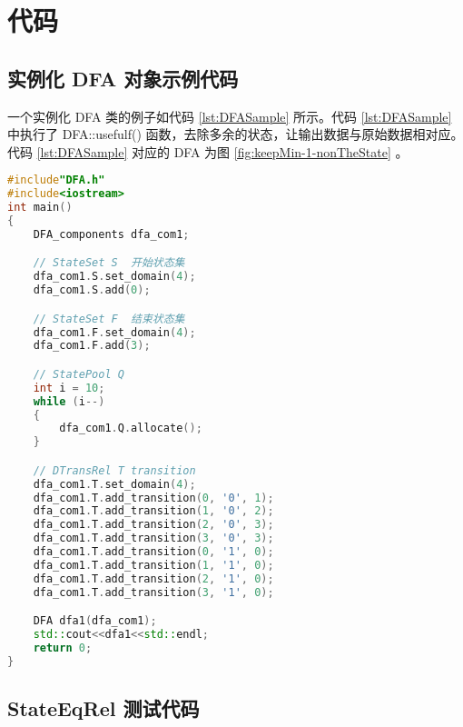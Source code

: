 \chapter{代码}

\section{实例化 DFA 对象示例代码}

一个实例化 DFA 类的例子如代码 \ref{lst:DFASample} 所示。代码 \ref{lst:DFASample} 中执行了 DFA::usefulf() 函数，去除多余的状态，让输出数据与原始数据相对应。代码 \ref{lst:DFASample} 对应的 DFA 为图 \ref{fig:keepMin-1-nonTheState} 。

\begin{lstlisting}[language=C++,label={lst:DFASample},caption={实例化DFA示例}]
#include"DFA.h"
#include<iostream>
int main()
{
    DFA_components dfa_com1;

    // StateSet S  开始状态集
    dfa_com1.S.set_domain(4);
    dfa_com1.S.add(0);

    // StateSet F  结束状态集
    dfa_com1.F.set_domain(4);
    dfa_com1.F.add(3);

    // StatePool Q 
    int i = 10;
    while (i--)
    {
        dfa_com1.Q.allocate();
    }

    // DTransRel T transition             
    dfa_com1.T.set_domain(4);
    dfa_com1.T.add_transition(0, '0', 1);
    dfa_com1.T.add_transition(1, '0', 2);
    dfa_com1.T.add_transition(2, '0', 3);
    dfa_com1.T.add_transition(3, '0', 3);
    dfa_com1.T.add_transition(0, '1', 0);
    dfa_com1.T.add_transition(1, '1', 0);
    dfa_com1.T.add_transition(2, '1', 0);
    dfa_com1.T.add_transition(3, '1', 0);

    DFA dfa1(dfa_com1);
    std::cout<<dfa1<<std::endl;
    return 0;
}
\end{lstlisting}

\section{StateEqRel 测试代码}

